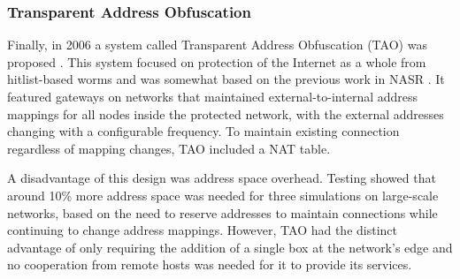 \subsubsection{Transparent Address Obfuscation}
\par Finally, in 2006 a system called Transparent Address Obfuscation (TAO) was proposed \cite{TAO}. This system focused on protection of the Internet as a whole from hitlist-based worms and was somewhat based on the previous work in NASR \cite{NASR}. It featured gateways on networks that maintained external-to-internal address mappings for all nodes inside the protected network, with the external addresses changing with a configurable frequency. To maintain existing connection regardless of mapping changes, TAO included a NAT table. 

\par A disadvantage of this design was address space overhead. Testing showed that around 10\% more address space was needed for three simulations on large-scale networks, based on the need to reserve addresses to maintain connections while continuing to change address mappings. However, TAO had the distinct advantage of only requiring the addition of a single box at the network's edge and no cooperation from remote hosts was needed for it to provide its services.


